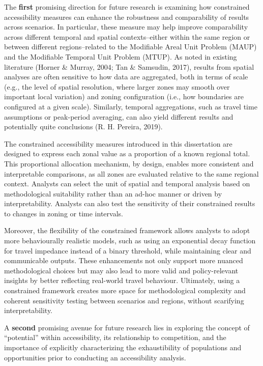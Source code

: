 \documentclass[
11pt, %
oneside, %
english, %
singlespacing, %
]{macthesis} %
\begin{document}
The \textbf{first} promising direction for future research is examining how constrained accessibility measures can enhance the robustness and comparability of results across scenarios. In particular, these measure may help improve comparability across different temporal and spatial contexts--either within the same region or between different regions--related to the Modifiable Areal Unit Problem (MAUP) and the Modifiable Temporal Unit Problem (MTUP). As noted in existing literature (Horner \& Murray, 2004; Tan \& Samsudin, 2017), results from spatial analyses are often sensitive to how data are aggregated, both in terms of scale (e.g., the level of spatial resolution, where larger zones may smooth over important local variation) and zoning configuration (i.e., how boundaries are configured at a given scale). Similarly, temporal aggregations, such as travel time assumptions or peak-period averaging, can also yield different results and potentially quite conclusions (R. H. Pereira, 2019).

The constrained accessibility measures introduced in this dissertation are designed to express each zonal value as a proportion of a known regional total. This proportional allocation mechanism, by design, enables more consistent and interpretable comparisons, as all zones are evaluated relative to the same regional context. Analysts can select the unit of spatial and temporal analysis based on methodological suitability rather than an ad-hoc manner or driven by interpretability. Analysts can also test the sensitivity of their constrained results to changes in zoning or time intervals.

Moreover, the flexibility of the constrained framework allows analysts to adopt more behaviourally realistic models, such as using an exponential decay function for travel impedance instead of a binary threshold, while maintaining clear and communicable outputs. These enhancements not only support more nuanced methodological choices but may also lead to more valid and policy-relevant insights by better reflecting real-world travel behaviour. Ultimately, using a constrained framework creates more space for methodological complexity and coherent sensitivity testing between scenarios and regions, without scarifying interpretability.

A \textbf{second} promising avenue for future research lies in exploring the concept of ``potential'' within accessibility, its relationship to competition, and the importance of explicitly characterizing the exhaustibility of populations and opportunities prior to conducting an accessibility analysis.
\end{document}
